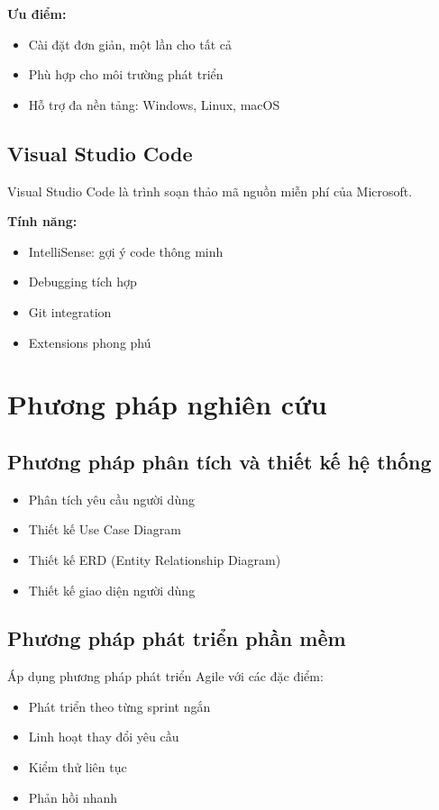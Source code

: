 \documentclass[13pt,a4paper]{extreport}
\begin{document}
\textbf{Ưu điểm:}
\begin{itemize}
    \item Cài đặt đơn giản, một lần cho tất cả
    \item Phù hợp cho môi trường phát triển
    \item Hỗ trợ đa nền tảng: Windows, Linux, macOS
\end{itemize}

\subsection{Visual Studio Code}

Visual Studio Code là trình soạn thảo mã nguồn miễn phí của Microsoft.

\textbf{Tính năng:}
\begin{itemize}
    \item IntelliSense: gợi ý code thông minh
    \item Debugging tích hợp
    \item Git integration
    \item Extensions phong phú
\end{itemize}

\section{Phương pháp nghiên cứu}

\subsection{Phương pháp phân tích và thiết kế hệ thống}

\begin{itemize}
    \item Phân tích yêu cầu người dùng
    \item Thiết kế Use Case Diagram
    \item Thiết kế ERD (Entity Relationship Diagram)
    \item Thiết kế giao diện người dùng
\end{itemize}

\subsection{Phương pháp phát triển phần mềm}

Áp dụng phương pháp phát triển Agile với các đặc điểm:
\begin{itemize}
    \item Phát triển theo từng sprint ngắn
    \item Linh hoạt thay đổi yêu cầu
    \item Kiểm thử liên tục
    \item Phản hồi nhanh
\end{itemize}
\end{document}
